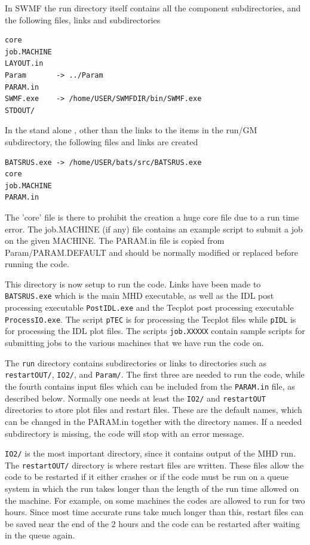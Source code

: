 In SWMF the run directory itself contains all the component 
subdirectories, and the following files, links and subdirectories
\begin{verbatim}
core
job.MACHINE
LAYOUT.in
Param       -> ../Param
PARAM.in
SWMF.exe    -> /home/USER/SWMFDIR/bin/SWMF.exe
STDOUT/
\end{verbatim}
In the stand alone \BATSRUS, other than the links to the
items in the run/GM subdirectory, the following files and links
are created
\begin{verbatim}
BATSRUS.exe -> /home/USER/bats/src/BATSRUS.exe
core
job.MACHINE
PARAM.in
\end{verbatim} 
The 'core' file is there to prohibit the creation a huge
core file due to a run time error. The job.MACHINE (if any)
file contains an example script to submit a job on the
given MACHINE. The PARAM.in file
is copied from Param/PARAM.DEFAULT and should be
normally modified or replaced before running the code.

This directory is now setup to run the code.  Links have been made to 
{\tt BATSRUS.exe} which is the main MHD executable, as well as the 
IDL post processing executable {\tt PostIDL.exe} and the Tecplot post 
processing executable {\tt ProcessIO.exe}.  The script {\tt pTEC}
is for processing the Tecplot files while {\tt pIDL} is for
processing the IDL plot files.  The scripts {\tt job.XXXXX} contain
sample scripts for submitting jobs to the various machines that we
have run the code on.  

The {\tt run} directory contains subdirectories or links to directories
such as {\tt restartOUT/}, {\tt IO2/}, and {\tt Param/}.  
The first three are needed to run the code, 
while the fourth contains input files which can be
included from the {\tt PARAM.in} file, as described below.
Normally one needs at least the {\tt IO2/} and {\tt restartOUT}
directories to store plot files and restart files.
These are the default names, which can be changed in the PARAM.in
together with the directory names.
If a needed subdirectory is missing, the code will stop with an error
message.

{\tt IO2/} is the most important directory, since it contains output
of the MHD run.  The {\tt restartOUT/} directory is where restart
files are written.  These files allow the code to be restarted if it
either crashes or if the code must be run on a queue system in which
the run takes longer than the length of the run time allowed on the
machine.  For example, on some machines the codes are allowed to run for
two hours.  Since most time accurate runs take much longer than
this, restart files can be saved near the end of the 2 hours
and the code can be restarted after waiting in the queue again.

